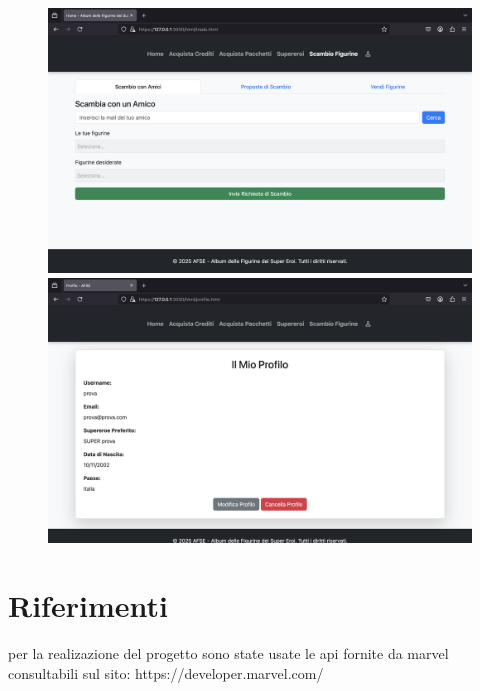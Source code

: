 \documentclass{article}
\begin{document}
\begin{figure}[H]
        \vspace{0.3cm} %

        \begin{minipage}{0.3\linewidth}
            \centering
            \includegraphics[width=\linewidth]{./content/scambio.png}
        \end{minipage}
        \hfill
        \begin{minipage}{0.3\linewidth}
            \centering
            \includegraphics[width=\linewidth]{./content/profilo.png}
        \end{minipage}

    \end{figure}

\section*{Riferimenti}
per la realizazione del progetto sono state usate le api fornite da marvel consultabili sul sito: https://developer.marvel.com/
\end{document}
